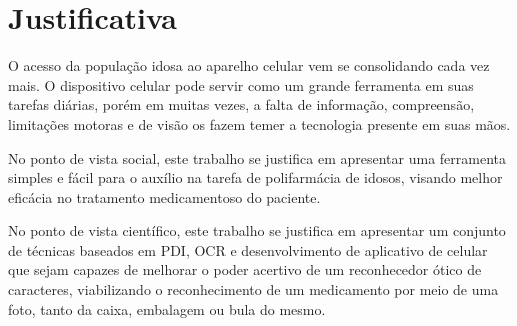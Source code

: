 \section{Justificativa}


O acesso da população idosa ao aparelho celular vem se consolidando cada vez mais. O dispositivo celular pode servir como um grande ferramenta em suas tarefas diárias, porém em muitas vezes, a falta de informação, compreensão, limitações motoras e de visão os fazem temer a tecnologia presente em suas mãos. 

No ponto de vista social, este trabalho se justifica em apresentar uma ferramenta simples e fácil para o auxílio na tarefa de polifarmácia de idosos, visando melhor eficácia no tratamento medicamentoso do paciente.

No ponto de vista científico, este trabalho se justifica em apresentar um conjunto de técnicas baseados em PDI, OCR e desenvolvimento de aplicativo de celular que sejam capazes de melhorar o poder acertivo de um reconhecedor ótico de caracteres, viabilizando o reconhecimento de um medicamento por meio de uma foto, tanto da caixa, embalagem ou bula do mesmo.







